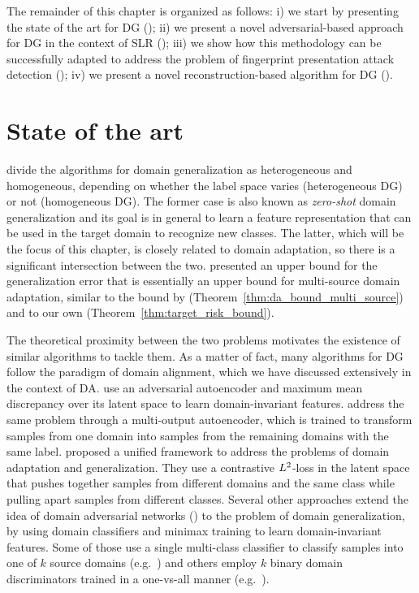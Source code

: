 The remainder of this chapter is organized as follows: i) we start by presenting the state of the art for DG (); ii) we present a novel adversarial-based approach for DG in the context of SLR (); iii) we show how this methodology can be successfully adapted to address the problem of fingerprint presentation attack detection (); iv) we present a novel reconstruction-based algorithm for DG ().

\section{State of the art}
\label{sec:dg_sota}
\citet{Zhou2021} divide the algorithms for domain generalization as heterogeneous and homogeneous, depending on whether the label space varies (heterogeneous DG) or not (homogeneous DG). The former case is also known as \emph{zero-shot} domain generalization and its goal is in general to learn a feature representation that can be used in the target domain to recognize new classes. The latter, which will be the focus of this chapter, is closely related to domain adaptation, so there is a significant intersection between the two. \citet{Albuquerque2019} presented an upper bound for the generalization error that is essentially an upper bound for multi-source domain adaptation, similar to the bound by \citet{Zhao2018} (Theorem~\ref{thm:da_bound_multi_source}) and to our own (Theorem~\ref{thm:target_risk_bound}).

The theoretical proximity between the two problems motivates the existence of similar algorithms to tackle them. As a matter of fact, many algorithms for DG follow the paradigm of domain alignment, which we have discussed extensively in the context of DA. \citet{Li2018} use an adversarial autoencoder and maximum mean discrepancy over its latent space to learn domain-invariant features. \citet{Ghifary2015} address the same problem through a multi-output autoencoder, which is trained to transform samples from one domain into samples from the remaining domains with the same label. \citet{Motiian2017} proposed a unified framework to address the problems of domain adaptation and generalization. They use a contrastive $L^2$-loss in the latent space that pushes together samples from different domains and the same class while pulling apart samples from different classes. Several other approaches extend the idea of domain adversarial networks (\citet{Ganin2015}) to the problem of domain generalization, by using domain classifiers and minimax training to learn domain-invariant features. Some of those use a single multi-class classifier to classify samples into one of $k$ source domains (e.g.\ \citet{Aslani2020, Matsuura2020}) and others employ $k$ binary domain discriminators trained in a one-vs-all manner (e.g.\ \citet{Shao2019, YaLi2018}).

